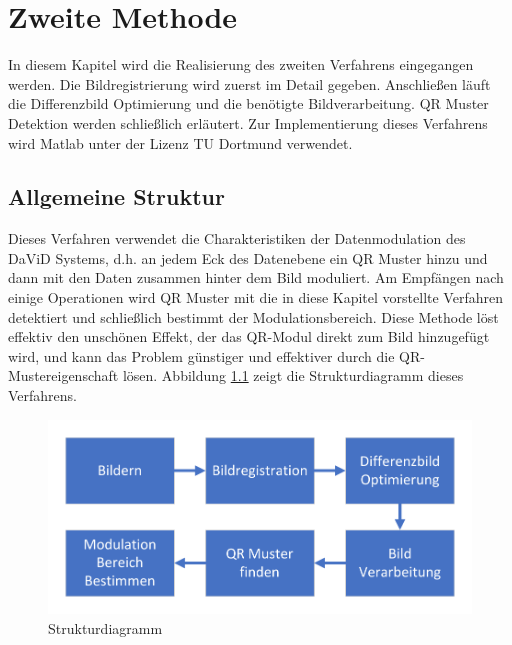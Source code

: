 \chapter{Zweite Methode} \label{cha:Zweite Methode}

In diesem Kapitel wird die Realisierung des zweiten Verfahrens eingegangen werden. Die Bildregistrierung wird zuerst im Detail gegeben. Anschließen läuft die Differenzbild Optimierung und die benötigte Bildverarbeitung. QR Muster Detektion werden schließlich erläutert. Zur Implementierung dieses Verfahrens wird Matlab unter der Lizenz TU Dortmund verwendet.

\section{Allgemeine Struktur} 

Dieses Verfahren verwendet die Charakteristiken der Datenmodulation des DaViD Systems, d.h. an jedem Eck des Datenebene ein QR Muster hinzu und dann mit den Daten zusammen hinter dem Bild moduliert. Am Empfängen nach einige Operationen   wird QR Muster mit die in diese Kapitel vorstellte Verfahren detektiert und schließlich bestimmt der Modulationsbereich. Diese Methode löst effektiv den unschönen Effekt, der das QR-Modul direkt zum Bild hinzugefügt wird, und kann das Problem günstiger und effektiver durch die QR-Mustereigenschaft lösen. Abbildung \ref{fig:Strukturdiagramm} zeigt die Strukturdiagramm dieses Verfahrens.

\begin{figure}[H]
 \centering 
 \includegraphics[keepaspectratio,width=1.0\textwidth]{images/4_ZweiteErfahrung/Strukturdiagramm.pdf}
 \caption{Strukturdiagramm}
 \label{fig:Strukturdiagramm}
\end{figure}

